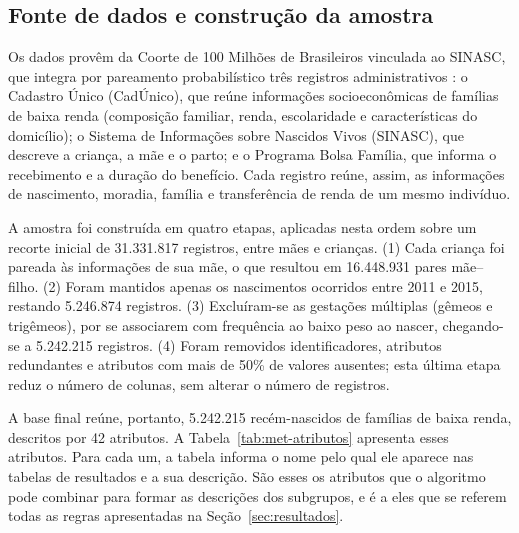 \subsection{Fonte de dados e construção da amostra}\label{subsec:met-dados}

Os dados provêm da Coorte de 100 Milhões de Brasileiros vinculada ao SINASC, que integra por pareamento probabilístico três registros administrativos \cite{pita2018}: o Cadastro Único (CadÚnico), que reúne informações socioeconômicas de famílias de baixa renda (composição familiar, renda, escolaridade e características do domicílio); o Sistema de Informações sobre Nascidos Vivos (SINASC), que descreve a criança, a mãe e o parto; e o Programa Bolsa Família, que informa o recebimento e a duração do benefício. Cada registro reúne, assim, as informações de nascimento, moradia, família e transferência de renda de um mesmo indivíduo.

A amostra foi construída em quatro etapas, aplicadas nesta ordem sobre um recorte inicial de 31.331.817 registros, entre mães e crianças. (1) Cada criança foi pareada às informações de sua mãe, o que resultou em 16.448.931 pares mãe--filho. (2) Foram mantidos apenas os nascimentos ocorridos entre 2011 e 2015, restando 5.246.874 registros. (3) Excluíram-se as gestações múltiplas (gêmeos e trigêmeos), por se associarem com frequência ao baixo peso ao nascer, chegando-se a 5.242.215 registros. (4) Foram removidos identificadores, atributos redundantes e atributos com mais de 50\% de valores ausentes; esta última etapa reduz o número de colunas, sem alterar o número de registros.

A base final reúne, portanto, 5.242.215 recém-nascidos de famílias de baixa renda, descritos por 42 atributos. A Tabela~\ref{tab:met-atributos} apresenta esses atributos. Para cada um, a tabela informa o nome pelo qual ele aparece nas tabelas de resultados e a sua descrição. São esses os atributos que o algoritmo pode combinar para formar as descrições dos subgrupos, e é a eles que se referem todas as regras apresentadas na Seção~\ref{sec:resultados}.

